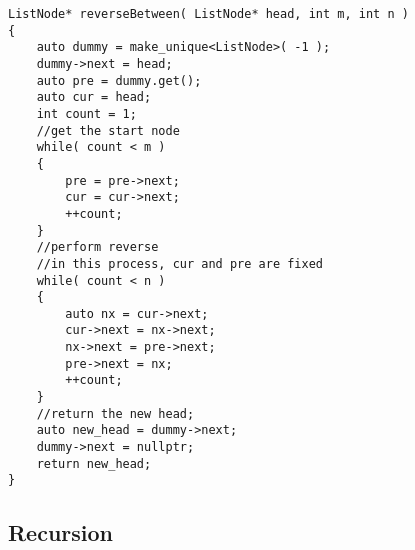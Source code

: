 \setcounter{lstlisting}{0}
\begin{lstlisting}[style=customc, caption={Iteraitve}]
ListNode* reverseBetween( ListNode* head, int m, int n )
{
    auto dummy = make_unique<ListNode>( -1 );
    dummy->next = head;
    auto pre = dummy.get();
    auto cur = head;
    int count = 1;
    //get the start node
    while( count < m )
    {
        pre = pre->next;
        cur = cur->next;
        ++count;
    }
    //perform reverse
    //in this process, cur and pre are fixed
    while( count < n )
    {
        auto nx = cur->next;
        cur->next = nx->next;
        nx->next = pre->next;
        pre->next = nx;
        ++count;
    }
    //return the new head;
    auto new_head = dummy->next;
    dummy->next = nullptr;
    return new_head;
}
\end{lstlisting}

\subsection{Recursion}
